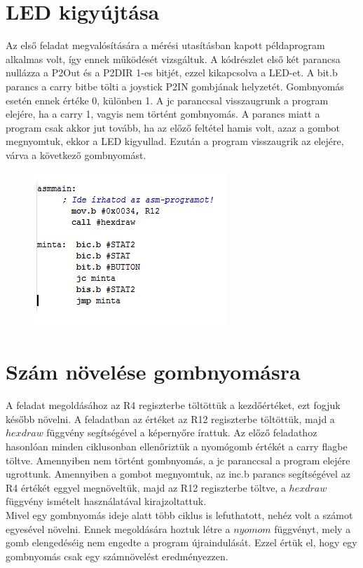 \documentclass[10pt, conference, a4paper]{ITKproc}
\begin{document}
\section{LED kigyújtása}
Az első feladat megvalósítására a mérési utasításban kapott példaprogram alkalmas volt, így ennek működését vizsgáltuk. A kódrészlet első két parancsa nullázza a P2Out és a P2DIR 1-es bitjét, ezzel kikapcsolva a LED-et. A bit.b parancs a carry bitbe tölti a joystick P2IN gombjának helyzetét. Gombnyomás esetén ennek értéke 0, különben 1. A jc paranccsal visszaugrunk a program elejére, ha a carry 1, vagyis nem történt gombnyomás. A parancs miatt a program csak akkor jut tovább, ha az előző feltétel hamis volt, azaz a gombot megnyomtuk, ekkor a LED kigyullad. Ezután a program visszaugrik az elejére, várva a következő gombnyomást. 

\begin{figure}[h]
\includegraphics[scale=0.65]{legelso}
\centering
\end{figure}

\section{Szám növelése gombnyomásra}

A feladat megoldásához az R4 regiszterbe töltöttük a kezdőértéket, ezt fogjuk később növelni. A feladatban az értéket az R12 regiszterbe töltöttük, majd a $hexdraw$ függvény segítségével a képernyőre írattuk. Az előző feladathoz hasonlóan minden ciklusonban ellenőriztük a nyomógomb értékét a carry flagbe töltve. Amennyiben nem történt gombnyomás, a jc paranccsal a program elejére ugrottunk. Amennyiben a gombot megnyomtuk, az inc.b parancs segítségével az R4 értékét eggyel megnöveltük, majd az R12 regiszterbe töltve, a $hexdraw$ függvény ismételt használatával kirajzoltattuk. \\
Mivel egy gombnyomás ideje alatt több ciklus is lefuthatott, nehéz volt a számot egyesével növelni. Ennek megoldására hoztuk létre a $nyomom$ függvényt, mely a gomb elengedéséig nem engedte a program újraindulását. Ezzel értük el, hogy egy gombnyomás csak egy számnövelést eredményezzen. 
\end{document}
